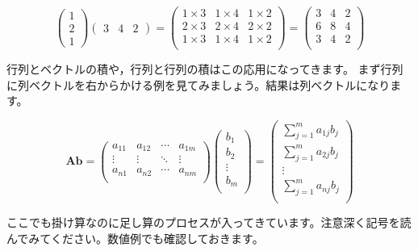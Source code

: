 \documentclass{ltjsbook}
\begin{document}
\begin{equation*}
	\begin{pmatrix}
		1 \\2\\1
	\end{pmatrix}
	\begin{pmatrix}
		3 & 4 & 2
	\end{pmatrix}
	=
	\begin{pmatrix}
		1 \times 3 & 1 \times 4 & 1 \times 2 \\
		2 \times 3 & 2 \times 4 & 2 \times 2 \\
		1 \times 3 & 1 \times 4 & 1 \times 2 \\
	\end{pmatrix}
	=
	\begin{pmatrix}
		3 & 4 & 2 \\
		6 & 8 & 4 \\
		3 & 4 & 2 \\
	\end{pmatrix}
\end{equation*}



行列とベクトルの積や，行列と行列の積はこの応用になってきます。
まず行列に列ベクトルを右からかける例を見てみましょう。結果は列ベクトルになります。

\begin{equation*}
	\bm{A} \bm{b} =
	\begin{pmatrix}
		a_{11} & a_{12} & \cdots & a_{1m} \\
		\vdots & \vdots & \ddots & \vdots \\
		a_{n1} & a_{n2} & \cdots & a_{nm} \\
	\end{pmatrix}
	\begin{pmatrix}
		b_1    \\
		b_2    \\
		\vdots \\
		b_m    \\
	\end{pmatrix}
	=
	\begin{pmatrix}
		\sum_{j=1}^{m} a_{1j}b_{j} \\
		\sum_{j=1}^{m} a_{2j}b_{j} \\
		\vdots                     \\
		\sum_{j=1}^{m} a_{nj}b_{j} \\
	\end{pmatrix}
\end{equation*}


ここでも掛け算なのに足し算のプロセスが入ってきています。注意深く記号を読んでみてください。数値例でも確認しておきます。
\end{document}
